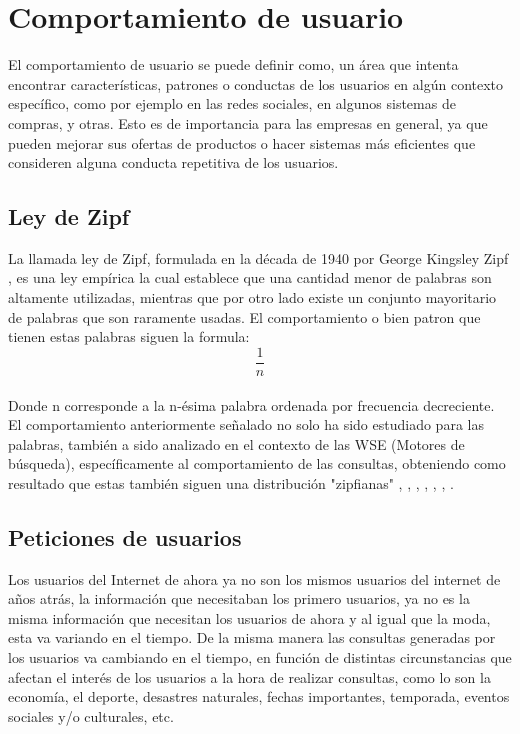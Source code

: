 \documentclass[12pt]{ociamthesis}  %
\begin{document}
\section{Comportamiento de usuario}

El comportamiento de usuario se puede definir como, un área que intenta encontrar características, patrones o conductas de los usuarios en algún contexto específico, como por ejemplo en las redes sociales, en algunos sistemas de compras, y otras. Esto es de importancia para las empresas en general, ya que pueden mejorar sus ofertas de productos o hacer sistemas más eficientes que consideren alguna conducta repetitiva de los usuarios.\\
\subsection{Ley de Zipf}
La llamada ley de Zipf, formulada en la década de 1940 por George Kingsley Zipf \cite{zipf2013psycho}, \cite{zipf2016human} es una ley empírica la cual establece que una cantidad menor de palabras son altamente utilizadas, mientras que por otro lado existe un conjunto mayoritario de palabras que son raramente usadas. El comportamiento o bien patron que tienen estas palabras siguen la formula:\\

\begin{equation}
\frac{1}{n}
\end{equation}\\

Donde n corresponde a la n-ésima palabra ordenada por frecuencia decreciente. El comportamiento anteriormente señalado no solo ha sido estudiado para las palabras, también a sido analizado en el contexto de las WSE (Motores de búsqueda), específicamente al comportamiento de las consultas, obteniendo como resultado que estas también siguen una distribución "zipfianas" \cite{baeza2012modeling}, \cite{cambazoglu2010refreshing}, \cite{gan2009improved}, \cite{lempel2003predictive}, \cite{wang2013impact}, \cite{saraiva2001rank}, \cite{xie2002locality}.



\subsection{Peticiones de usuarios}
Los usuarios del Internet de ahora ya no son los mismos usuarios del internet de años atrás, la información que necesitaban los primero usuarios, ya no es la misma información que necesitan los usuarios de ahora y al igual que la moda, esta va variando en el tiempo. De la misma manera las consultas generadas por los usuarios va cambiando en el tiempo, en función de distintas circunstancias que afectan el interés de los usuarios a la hora de realizar consultas, como lo son la economía, el deporte, desastres naturales, fechas importantes, temporada, eventos sociales y/o culturales, etc.\\
\end{document}
